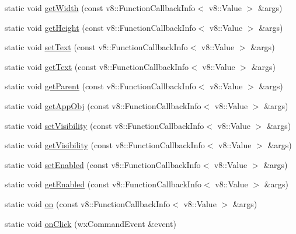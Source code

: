 \begin{DoxyCompactItemize}
\item 
static void \mbox{\hyperlink{class_rad_j_a_v_1_1_g_u_i_1_1_menu_item_aa35b9b1aa816d798031ece0759be4c6e}{get\+Width}} (const v8\+::\+Function\+Callback\+Info$<$ v8\+::\+Value $>$ \&args)
\item 
static void \mbox{\hyperlink{class_rad_j_a_v_1_1_g_u_i_1_1_menu_item_ac6429e2a4e16eafec815035cfe54e3b1}{get\+Height}} (const v8\+::\+Function\+Callback\+Info$<$ v8\+::\+Value $>$ \&args)
\item 
static void \mbox{\hyperlink{class_rad_j_a_v_1_1_g_u_i_1_1_menu_item_ab649c3151c925389d63aff34fd8fda0c}{set\+Text}} (const v8\+::\+Function\+Callback\+Info$<$ v8\+::\+Value $>$ \&args)
\item 
static void \mbox{\hyperlink{class_rad_j_a_v_1_1_g_u_i_1_1_menu_item_af23d51318c8074f917335fbe681298fa}{get\+Text}} (const v8\+::\+Function\+Callback\+Info$<$ v8\+::\+Value $>$ \&args)
\item 
static void \mbox{\hyperlink{class_rad_j_a_v_1_1_g_u_i_1_1_menu_item_a7abfda7f954f84f1ef7018c71a1d1e83}{get\+Parent}} (const v8\+::\+Function\+Callback\+Info$<$ v8\+::\+Value $>$ \&args)
\item 
static void \mbox{\hyperlink{class_rad_j_a_v_1_1_g_u_i_1_1_menu_item_a4ddb663b8697a2a85f5d3a57fa6c621c}{get\+App\+Obj}} (const v8\+::\+Function\+Callback\+Info$<$ v8\+::\+Value $>$ \&args)
\item 
static void \mbox{\hyperlink{class_rad_j_a_v_1_1_g_u_i_1_1_menu_item_acba74b6337938ad27ff0ab98ba7cd10b}{set\+Visibility}} (const v8\+::\+Function\+Callback\+Info$<$ v8\+::\+Value $>$ \&args)
\item 
static void \mbox{\hyperlink{class_rad_j_a_v_1_1_g_u_i_1_1_menu_item_ada952e989d6fbc45a3160f280ded1ae7}{get\+Visibility}} (const v8\+::\+Function\+Callback\+Info$<$ v8\+::\+Value $>$ \&args)
\item 
static void \mbox{\hyperlink{class_rad_j_a_v_1_1_g_u_i_1_1_menu_item_a658a2c7a598fd6feb6cb321a8d3b953a}{set\+Enabled}} (const v8\+::\+Function\+Callback\+Info$<$ v8\+::\+Value $>$ \&args)
\item 
static void \mbox{\hyperlink{class_rad_j_a_v_1_1_g_u_i_1_1_menu_item_ab54be9464064c18dea31100c0266c633}{get\+Enabled}} (const v8\+::\+Function\+Callback\+Info$<$ v8\+::\+Value $>$ \&args)
\item 
static void \mbox{\hyperlink{class_rad_j_a_v_1_1_g_u_i_1_1_menu_item_a5cf8bd44aebddac18a720d71e7758dd5}{on}} (const v8\+::\+Function\+Callback\+Info$<$ v8\+::\+Value $>$ \&args)
\item 
static void \mbox{\hyperlink{class_rad_j_a_v_1_1_g_u_i_1_1_menu_item_ae3f5cf4552349c2f432c022997047508}{on\+Click}} (wx\+Command\+Event \&event)
\end{DoxyCompactItemize}


